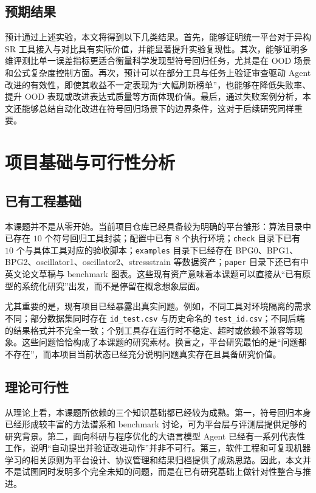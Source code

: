 \documentclass[UTF8,12pt]{ctexart}
\begin{document}
\subsection{预期结果}

预计通过上述实验，本文将得到以下几类结果。首先，能够证明统一平台对于异构 SR 工具接入与对比具有实际价值，并能显著提升实验复现性。其次，能够证明多维评测比单一误差指标更适合衡量科学发现型符号回归任务，尤其是在 OOD 场景和公式复杂度控制方面。再次，预计可以在部分工具与任务上验证审查驱动 Agent 改进的有效性，即使其收益不一定表现为“大幅刷新榜单”，也能够在降低失败率、提升 OOD 表现或改进表达式质量等方面体现价值。最后，通过失败案例分析，本文还能够总结自动化改进在符号回归场景下的边界条件，这对于后续研究同样重要。

\section{项目基础与可行性分析}

\subsection{已有工程基础}

本课题并不是从零开始。当前项目仓库已经具备较为明确的平台雏形：算法目录中已存在 $10$ 个符号回归工具封装；配置中已有 $8$ 个执行环境；\texttt{check} 目录下已有 $10$ 个与具体工具对应的验收脚本；\texttt{examples} 目录下已经存在 BPG0、BPG1、BPG2、oscillator1、oscillator2、stressstrain 等数据资产；\texttt{paper} 目录下还已有中英文论文草稿与 benchmark 图表。这些现有资产意味着本课题可以直接从“已有原型的系统化研究”出发，而不是停留在概念想象层面。

尤其重要的是，现有项目已经暴露出真实问题。例如，不同工具对环境隔离的需求不同；部分数据集同时存在 \texttt{id\_test.csv} 与历史命名的 \texttt{test\_id.csv}；不同后端的结果格式并不完全一致；个别工具存在运行时不稳定、超时或依赖不兼容等现象。这些问题恰恰构成了本课题的研究素材。换言之，平台研究最怕的是“问题都不存在”，而本项目当前状态已经充分说明问题真实存在且具备研究价值。

\subsection{理论可行性}

从理论上看，本课题所依赖的三个知识基础都已经较为成熟。第一，符号回归本身已经形成较丰富的方法谱系和 benchmark 讨论，可为平台层与评测层提供足够的研究背景。第二，面向科研与程序优化的大语言模型 Agent 已经有一系列代表性工作，说明“自动提出并验证改进动作”并非不可行。第三，软件工程和可复现机器学习的相关原则为平台设计、协议管理和结果归档提供了成熟思路。因此，本文并不是试图同时发明多个完全未知的问题，而是在已有研究基础上做针对性整合与推进。
\end{document}
